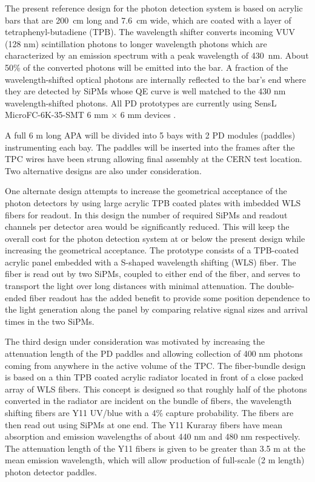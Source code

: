 The present reference design for the photon detection system is based on acrylic bars that are 200~cm long and 7.6~cm wide, which are coated with a layer of tetraphenyl-butadiene (TPB). The wavelength shifter converts incoming VUV (128 nm) scintillation photons
to longer wavelength photons which are characterized by an emission spectrum with a peak wavelength of 430~nm.
About 50\% of the converted photons will be emitted into the bar.
  A fraction of the wavelength-shifted optical photons are internally reflected to the bar's end where they are detected by SiPMs whose QE curve is well matched to the 430 nm wavelength-shifted photons. All PD prototypes are currently using SensL MicroFC-6K-35-SMT 6 mm $\times$ 6 mm devices \cite{sensl}. 

A full 6 m long APA will be divided into 5 bays with 2 PD modules (paddles) instrumenting each bay. The paddles will be inserted into the frames after the TPC wires have been strung allowing  final assembly at the CERN test location. Two alternative designs are also under consideration. 


One alternate design attempts to increase the geometrical acceptance of the photon detectors by using large acrylic TPB coated plates with imbedded WLS fibers for readout. In this design the number of required SiPMs and readout channels per detector area would be significantly reduced.  This will keep the overall cost for the photon detection system at or below the present design while increasing the geometrical acceptance. The prototype consists of a TPB-coated acrylic panel embedded with a S-shaped wavelength shifting (WLS) fiber. The fiber is read out by two SiPMs, coupled to either end of the fiber, and serves to transport the light over long distances with minimal attenuation. The double-ended fiber readout has the added benefit to provide some position dependence to the light generation along the panel by comparing relative signal sizes and arrival times in the two SiPMs. 



The third design under consideration was motivated by increasing the attenuation length of the PD paddles and allowing collection of 400 nm photons coming from anywhere in the active volume of the TPC.  The fiber-bundle design is based on a thin TPB coated acrylic radiator located in front of a close packed array of WLS fibers. This concept is designed so that roughly half of the photons converted in the radiator are incident on the bundle of fibers, the wavelength shifting fibers are Y11 UV/blue with a 4\% capture probability. The fibers are then read out using SiPMs at one end. The Y11  Kuraray fibers have mean absorption and emission wavelengths of about 440 nm and 480 nm respectively.  The attenuation length of the Y11 fibers is given to be greater than 3.5 m at the mean emission wavelength, which will allow production of full-scale (2 m length) photon detector paddles.


